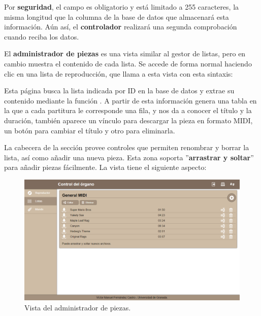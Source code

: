 \smallskip

Por \textbf{seguridad}, el campo es obligatorio y está limitado a 255 caracteres, la misma longitud que la columna de la base de datos que almacenará esta información. Aún así, el \textbf{controlador} realizará una segunda comprobación cuando reciba los datos.

El \textbf{administrador de piezas} es una vista similar al gestor de listas, pero en cambio muestra el contenido de cada lista. Se accede de forma normal haciendo clic en una lista de reproducción, que llama a esta vista con esta sintaxis:

\begin{center}
\end{center}

Esta página busca la lista indicada por ID en la base de datos y extrae su contenido mediante la función . A partir de esta información genera una tabla en la que a cada partitura le corresponde una fila, y nos da a conocer el título y la duración, también aparece un vínculo para descargar la pieza en formato \acrshort{MIDI}, un botón para cambiar el título y otro para eliminarla. 

La cabecera de la sección provee controles que permiten renombrar y borrar la lista, así como añadir una nueva pieza. Esta zona soporta ''\textbf{arrastrar y soltar}'' para añadir piezas fácilmente. La vista tiene el siguiente aspecto:

\smallskip

\begin{figure}[H]
	\noindent \begin{centering}
		\includegraphics[width=\linewidth*3/4]{capitulo5/cap_piezas}
		\par\end{centering}
	\smallskip
	\caption{\label{fig:cap_piezas} Vista del administrador de piezas.}
\end{figure} 

